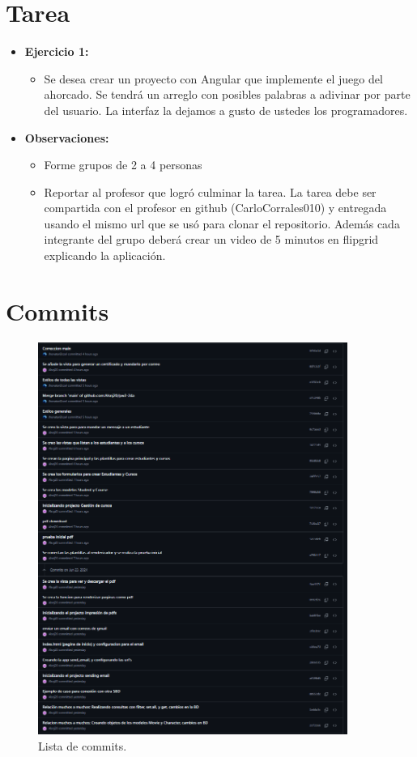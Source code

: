 \documentclass{article}
\begin{document}
\tableofcontents
\pagebreak


\section{Tarea}
\begin{itemize}
	\item \textbf{Ejercicio 1:}
	      \begin{itemize}
		      \item Se desea crear un proyecto con Angular que implemente el juego del ahorcado.  Se tendrá un arreglo con posibles palabras a adivinar por parte del usuario.  La interfaz la dejamos a gusto de ustedes los programadores.
	      \end{itemize}
	\item \textbf{Observaciones:}
	      \begin{itemize}
		      \item Forme grupos de 2 a 4 personas
		      \item Reportar al profesor que logró culminar la tarea. La tarea debe ser compartida con el profesor en github (CarloCorrales010) y entregada usando el mismo url que se usó para clonar el repositorio. Además cada integrante del grupo deberá crear un video de 5 minutos en flipgrid explicando la aplicación.
	      \end{itemize}
\end{itemize}
\pagebreak
\section{Commits}
\begin{figure}[H]
	\centering
	\includegraphics[width=0.9\textwidth,keepaspectratio]{img/commits.png}
	\caption{Lista de commits.}
\end{figure}
\pagebreak
\end{document}
